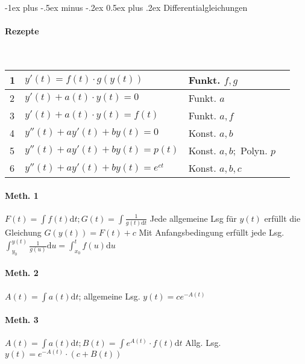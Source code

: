 \documentclass[paper=a3,paper=landscape, fontsize=9pt,DIV=25]{scrartcl}
\makeatletter
\renewcommand{\section}{\@startsection{section}{1}{0mm}%
  {-1ex plus -.5ex minus -.2ex}%
  {0.5ex plus .2ex}%
  {\color{blue}\normalfont\large\bfseries}}
\makeatother
\begin{document}
\begin{multicols*}{4}
  \section{Differentialgleichungen}

  \paragraph{Rezepte}\hspace{0pt}\\

  
  \begin{tabular}{|l|l|l|l|}
    \hline
    1   & $y'(t)=f(t) \cdot g(y(t))$      & Funkt. $f,g$              \\ \hline
    2   & $y'(t)+a(t) \cdot y(t) = 0$     & Funkt. $a$                \\ \hline
    3   & $y'(t)+a(t) \cdot y(t) = f(t)$  & Funkt. $a,f$              \\ \hline
    4   & $y''(t)+ay'(t)+by(t) = 0$       & Konst. $a,b$              \\ \hline
    5   & $y''(t)+ay'(t)+by(t) = p(t)$    & Konst. $a,b;$ Polyn. $p$  \\ \hline
    6   & $y''(t)+ay'(t)+by(t) = e^{ct}$   & Konst. $a,b,c$            \\ \hline
  \end{tabular}

  \paragraph{Meth. 1}

  $F(t)=\int f(t) \mathrm{d}t;G(t)=\int \frac{1}{g(t)\mathrm{d}t}$
  Jede allgemeine Lsg für $y(t)$ erfüllt die Gleichung $G(y(t))=F(t)+c$
  Mit Anfangsbedingung erfüllt jede Lsg. $\int_{y_0}^{y(t)}\frac{1}{g(u)}\mathrm{d}u=\int_{x_0}^{t}f(u)\mathrm{d}u$

  \paragraph{Meth. 2}

  $A(t)=\int a(t)\mathrm{d}t$; allgemeine Lsg. $y(t)=ce^{-A(t)}$

  \paragraph{Meth. 3}

  $A(t)=\int a(t)\mathrm{d}t; B(t)=\int e^{A(t)} \cdot f(t) \mathrm{d}t$
  Allg. Lsg. $y(t)=e^{-A(t)} \cdot (c+B(t))$


\end{multicols*}
\end{document}
